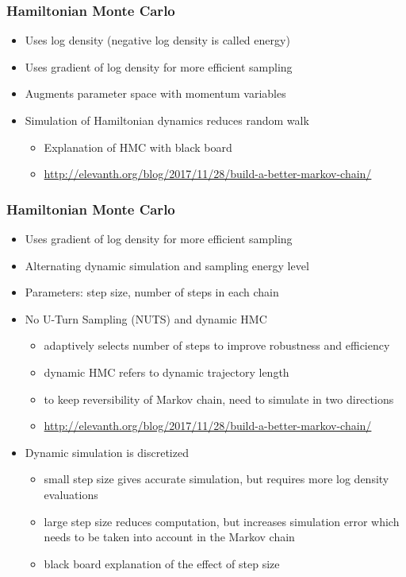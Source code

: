 \documentclass[10pt,handout]{beamer}
\begin{document}
\begin{frame}

\frametitle{Hamiltonian Monte Carlo}

  \begin{itemize}
  \item Uses log density (negative log density is called energy)
  \item Uses gradient of log density for more efficient sampling
  \item Augments parameter space with momentum variables
  \item Simulation of Hamiltonian dynamics reduces random walk
    \begin{itemize}
    \item Explanation of HMC with black board
    \item \url{http://elevanth.org/blog/2017/11/28/build-a-better-markov-chain/}
    \end{itemize}
  \end{itemize}

\end{frame}

\begin{frame}

\frametitle{Hamiltonian Monte Carlo}

  \begin{itemize}
  \item Uses gradient of log density for more efficient sampling
  \item Alternating dynamic simulation and sampling energy level
  \item<2-> Parameters: step size, number of steps in each chain
  \item<3-> No U-Turn Sampling (NUTS) and dynamic HMC
    \begin{itemize}
    \item adaptively selects number of steps to improve robustness and
      efficiency
    \item dynamic HMC refers to dynamic trajectory length
    \item to keep reversibility of Markov chain, need to simulate in two directions
    \item {\footnotesize \url{http://elevanth.org/blog/2017/11/28/build-a-better-markov-chain/}}
    \end{itemize}
  \item<4-> Dynamic simulation is discretized
    \begin{itemize}
    \item small step size gives accurate simulation, but requires more log density evaluations
    \item large step size reduces computation, but increases
      simulation error which needs to be taken into account in the
      Markov chain
    \item black board explanation of the effect of step size
    \end{itemize}
\end{itemize}

\end{frame}
\end{document}
